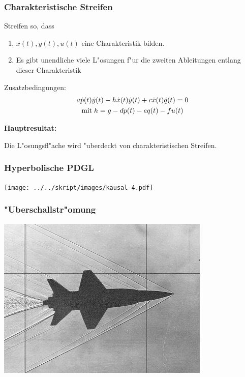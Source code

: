 \documentclass{beamer}
\begin{document}
\begin{frame}
\frametitle{Charakteristische Streifen}
Streifen so, dass
\begin{enumerate}
\item
$x(t), y(t), u(t)$ eine Charakteristik bilden.
\item
Es gibt unendliche viele L"osungen f"ur die zweiten Ableitungen entlang
dieser Charakteristik
\end{enumerate}

Zusatzbedingungen:
\begin{gather*}
a\dot p(t)\dot y(t)
-
h \dot x(t) \dot y(t)
+
c \dot x(t)\dot q(t)=0
\\
\text{mit\;}
h=g-dp(t)-eq(t)-fu(t)
\end{gather*}

\bigskip

{\bf Hauptresultat:}
\medskip

\begin{theorem}
Die L"osungsfl"ache wird "uberdeckt von charakteristischen Streifen.
\end{theorem}

\end{frame}

\begin{frame}
\frametitle{Hyperbolische PDGL}
\begin{center}
\texttt{[image: ../../skript/images/kausal-4.pdf]}
\end{center}
\end{frame}

\begin{frame}
\frametitle{"Uberschallstr"omung}
\begin{center}
\includegraphics[width=\hsize]{../../skript/graphics/i-5-1.jpg}
\end{center}
\end{frame}
\end{document}
